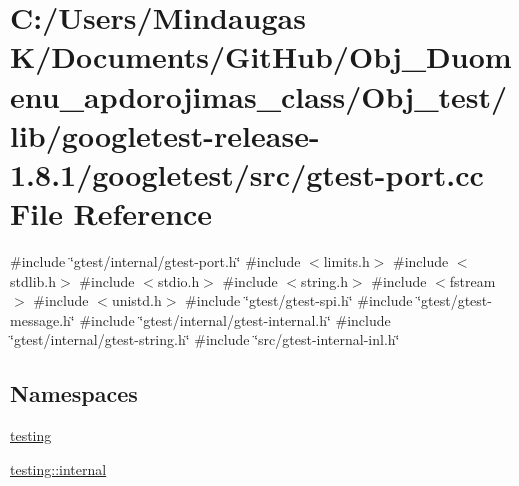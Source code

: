 \hypertarget{_obj__test_2lib_2googletest-release-1_88_81_2googletest_2src_2gtest-port_8cc}{}\section{C\+:/\+Users/\+Mindaugas K/\+Documents/\+Git\+Hub/\+Obj\+\_\+\+Duomenu\+\_\+apdorojimas\+\_\+class/\+Obj\+\_\+test/lib/googletest-\/release-\/1.8.1/googletest/src/gtest-\/port.cc File Reference}
\label{_obj__test_2lib_2googletest-release-1_88_81_2googletest_2src_2gtest-port_8cc}
{\ttfamily \#include \char`\"{}gtest/internal/gtest-\/port.\+h\char`\"{}}\newline
{\ttfamily \#include $<$limits.\+h$>$}\newline
{\ttfamily \#include $<$stdlib.\+h$>$}\newline
{\ttfamily \#include $<$stdio.\+h$>$}\newline
{\ttfamily \#include $<$string.\+h$>$}\newline
{\ttfamily \#include $<$fstream$>$}\newline
{\ttfamily \#include $<$unistd.\+h$>$}\newline
{\ttfamily \#include \char`\"{}gtest/gtest-\/spi.\+h\char`\"{}}\newline
{\ttfamily \#include \char`\"{}gtest/gtest-\/message.\+h\char`\"{}}\newline
{\ttfamily \#include \char`\"{}gtest/internal/gtest-\/internal.\+h\char`\"{}}\newline
{\ttfamily \#include \char`\"{}gtest/internal/gtest-\/string.\+h\char`\"{}}\newline
{\ttfamily \#include \char`\"{}src/gtest-\/internal-\/inl.\+h\char`\"{}}\newline
\subsection*{Namespaces}
\begin{DoxyCompactItemize}
\item 
 \mbox{\hyperlink{namespacetesting}{testing}}
\item 
 \mbox{\hyperlink{namespacetesting_1_1internal}{testing\+::internal}}
\end{DoxyCompactItemize}

